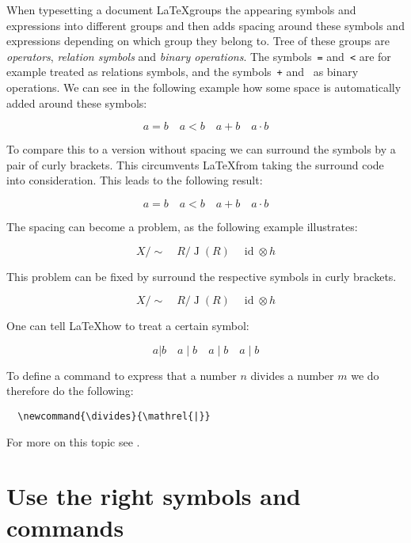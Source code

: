 \documentclass[a4paper, 10pt, abstract=on, headings=standardclasses]{scrartcl}
\begin{document}
When typesetting a document \LaTeX groups the appearing symbols and expressions into different groups and then adds spacing around these symbols and expressions depending on which group they belong to.
Tree of these groups are \emph{operators}, \emph{relation symbols} and \emph{binary operations}.
The symbols~\texttt{=} and~\texttt{<} are for example treated as relations symbols, and the symbols~\texttt{+} and~ as binary operations.
We can see in the following example how some space is automatically added around these symbols:
\begin{LTXexample}[pos = r]
\[
    a = b
    \quad
    a < b
    \quad
    a + b
    \quad
    a \cdot b
  \]
\end{LTXexample}
To compare this to a version without spacing we can surround the symbols by a pair of curly brackets.
This circumvents \LaTeX from taking the surround code into consideration.
This leads to the following result:
\begin{LTXexample}[pos = r]
\[
    a {=} b
    \quad
    a {<} b
    \quad
    a {+} b
    \quad
    a {\cdot} b
  \]
\end{LTXexample}
The spacing can become a problem, as the following example illustrates:
\begin{LTXexample}[pos = r]
  \[
    X/\sim
    \quad
    R/\operatorname{J}(R)
    \quad
    \operatorname{id} \otimes h
  \]
\end{LTXexample}
This problem can be fixed by surround the respective symbols in curly brackets.
\begin{LTXexample}[pos = r]
  \[
    X/{\sim}
    \quad
    R/{\operatorname{J}(R)}
    \quad
    {\operatorname{id}} \otimes h
  \]
\end{LTXexample}
One can tell \LaTeX how to treat a certain symbol:
\begin{LTXexample}[pos = r]
  \[
    a | b
    \quad
    a \mathop{|} b
    \quad
    a \mathrel{|} b
    \quad
    a \mathbin{|} b
  \]
\end{LTXexample}
To define a command  to express that a number $n$ divides a number $m$ we do therefore do the following:
\begin{lstlisting}
  \newcommand{\divides}{\mathrel{|}}
\end{lstlisting}
For more on this topic see \cite{tex_binrel}.





\section{Use the right symbols and commands}
\end{document}
